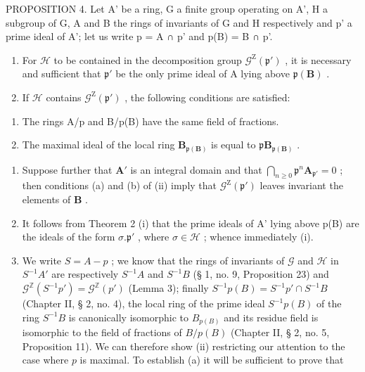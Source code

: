 PROPOSITION 4. Let A' be a ring, G a finite group operating on A', H a subgroup of G, A and B the rings of invariants of G and H respectively and p' a prime ideal of A'; let us write p = A ∩ p' and p(B) = B ∩ p'.

\begin{enumerate}
\def\labelenumi{(\roman{enumi})}
\item
  For \(\mathcal{H}\) to be contained in the decomposition group \(\mathcal{G}^{\mathrm{Z}}(\mathfrak{p}')\) , it is necessary and sufficient that \(\mathfrak{p}'\) be the only prime ideal of A lying above \(\mathfrak{p}(\mathbf{B})\) .
\item
  If \(\mathcal{H}\) contains \(\mathcal{G}^{\mathrm{Z}}(\mathfrak{p}')\) , the following conditions are satisfied:
\end{enumerate}

\begin{enumerate}
\def\labelenumi{(\alph{enumi})}
\item
  The rings A/p and B/p(B) have the same field of fractions.
\item
  The maximal ideal of the local ring \(\mathbf{B}_{\mathfrak{p}(\mathbf{B})}\) is equal to \(\mathfrak{p}\mathbf{B}_{\mathfrak{p}(\mathbf{B})}\) .
\end{enumerate}

\begin{enumerate}
\def\labelenumi{(\roman{enumi})}
\setcounter{enumi}{2}
\item
  Suppose further that \(\mathbf{A}'\) is an integral domain and that \(\bigcap_{n\geqslant 0}\mathfrak{p}^n\mathbf{A}_{\mathfrak{p}'} = 0\) ; then conditions (a) and (b) of (ii) imply that \(\mathcal{G}^{\mathrm{Z}}(\mathfrak{p}')\) leaves invariant the elements of \(\mathbf{B}\) .

\setcounter{enumi}{0}
\item
  It follows from Theorem 2 (i) that the prime ideals of A' lying above p(B) are the ideals of the form \(\sigma. \mathfrak{p}'\) , where \(\sigma \in \mathcal{H}\) ; whence immediately (i).

\item
  We write \(S = A - p\) ; we know that the rings of invariants of \(\mathcal{G}\) and \(\mathcal{H}\) in \(S^{-1}A'\) are respectively \(S^{-1}A\) and \(S^{-1}B\) (§ 1, no. 9, Proposition 23) and \(\mathcal{G}^{\mathbb{Z}}(S^{-1}p') = \mathcal{G}^{\mathbb{Z}}(p')\) (Lemma 3); finally \(S^{-1}p(B) = S^{-1}p' \cap S^{-1}B\) (Chapter II, § 2, no. 4), the local ring of the prime ideal \(S^{-1}p(B)\) of the ring \(S^{-1}B\) is canonically isomorphic to \(B_{p(B)}\) and its residue field is isomorphic to the field of fractions of \(B/p(B)\) (Chapter II, § 2, no. 5, Proposition 11). We can therefore show (ii) restricting our attention to the case where \(p\) is maximal. To establish (a) it will be sufficient to prove that
\end{enumerate}

